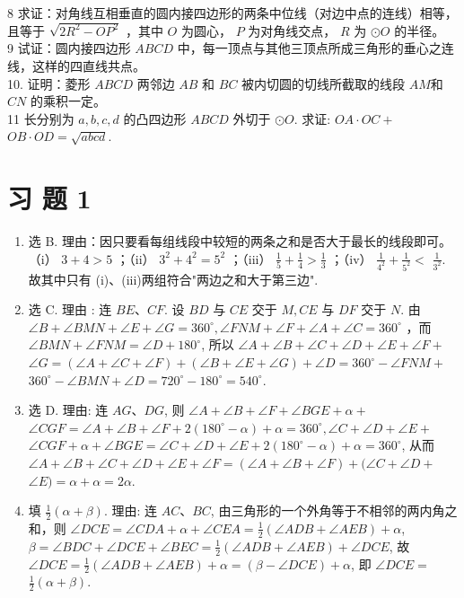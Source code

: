 \documentclass[10pt]{article}
\begin{document}
8 求证：对角线互相垂直的圆内接四边形的两条中位线（对边中点的连线）相等，且等于 $\sqrt{2 R^{2}-O P^{2}}$ ，其中 $O$ 为圆心， $P$ 为对角线交点， $R$ 为 $\odot O$ 的半径。\\
9 试证：圆内接四边形 $A B C D$ 中，每一顶点与其他三顶点所成三角形的垂心之连线，这样的四直线共点。\\
10. 证明：菱形 $A B C D$ 两邻边 $A B$ 和 $B C$ 被内切圆的切线所截取的线段 $A M$和 $C N$ 的乘积一定。\\
11 长分别为 $a, b, c, d$ 的凸四边形 $A B C D$ 外切于 $\odot O$. 求证: $O A \cdot O C+$ $O B \cdot O D=\sqrt{a b c d}$.

\section*{习 题 1}
\begin{enumerate}
  \item 选 B. 理由：因只要看每组线段中较短的两条之和是否大于最长的线段即可。（i） $3+4>5$ ；（ii） $3^{2}+4^{2}=5^{2}$ ；（iii） $\frac{1}{5}+\frac{1}{4}>\frac{1}{3}$ ；（iv） $\frac{1}{4^{2}}+\frac{1}{5^{2}}<$ $\frac{1}{3^{2}}$. 故其中只有 (i)、(iii)两组符合"两边之和大于第三边".
  \item 选 C. 理由 : 连 $B E 、 C F$. 设 $B D$ 与 $C E$ 交于 $M, C E$ 与 $D F$ 交于 $N$. 由 $\angle B+\angle B M N+\angle E+\angle G=360^{\circ}, \angle F N M+\angle F+\angle A+\angle C=360^{\circ}$ ，而 $\angle B M N+\angle F N M=\angle D+180^{\circ}$, 所以 $\angle A+\angle B+\angle C+\angle D+\angle E+\angle F+$ $\angle G=(\angle A+\angle C+\angle F)+(\angle B+\angle E+\angle G)+\angle D=360^{\circ}-\angle F N M+$ $360^{\circ}-\angle B M N+\angle D=720^{\circ}-180^{\circ}=540^{\circ}$.
  \item 选 D. 理由: 连 $A G 、 D G$, 则 $\angle A+\angle B+\angle F+\angle B G E+\alpha+$ $\angle C G F=\angle A+\angle B+\angle F+2\left(180^{\circ}-\alpha\right)+\alpha=360^{\circ}, \angle C+\angle D+\angle E+$ $\angle C G F+\alpha+\angle B G E=\angle C+\angle D+\angle E+2\left(180^{\circ}-\alpha\right)+\alpha=360^{\circ}$, 从而 $\angle A+\angle B+\angle C+\angle D+\angle E+\angle F=(\angle A+\angle B+\angle F)+(\angle C+\angle D+$ $\angle E)=\alpha+\alpha=2 \alpha$.
  \item 填 $\frac{1}{2}(\alpha+\beta)$. 理由: 连 $A C 、 B C$, 由三角形的一个外角等于不相邻的两内角之和，则 $\angle D C E=\angle C D A+\alpha+\angle C E A=\frac{1}{2}(\angle A D B+\angle A E B)+\alpha$, $\beta=\angle B D C+\angle D C E+\angle B E C=\frac{1}{2}(\angle A D B+\angle A E B)+\angle D C E$, 故 $\angle D C E=\frac{1}{2}(\angle A D B+\angle A E B)+\alpha=(\beta-\angle D C E)+\alpha$, 即 $\angle D C E=$ $\frac{1}{2}(\alpha+\beta)$.

\end{enumerate}
\end{document}
